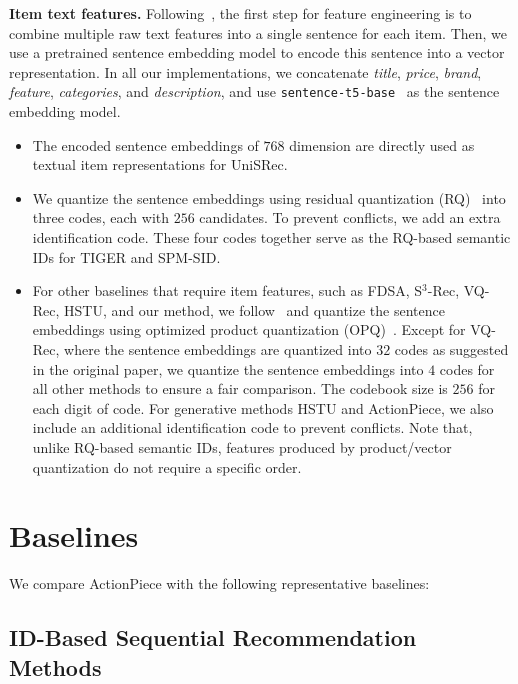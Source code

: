 \textbf{Item text features.} Following~\citet{rajput2023tiger,zheng2024lcrec,sheng2025alpharec}, the first step for feature engineering is to combine multiple raw text features into a single sentence for each item. Then, we use a pretrained sentence embedding model to encode this sentence into a vector representation. In all our implementations, we concatenate \emph{title}, \emph{price}, \emph{brand}, \emph{feature}, \emph{categories}, and \emph{description}, and use \texttt{sentence-t5-base}~\cite{ni2022sentencet5} as the sentence embedding model.
\begin{itemize}
\item The encoded sentence embeddings of $768$ dimension are directly used as textual item representations for UniSRec.
\item We quantize the sentence embeddings using residual quantization (RQ)~\cite{rajput2023tiger,zeghidour2021rqvae,zheng2024enhancing} into three codes, each with $256$ candidates. To prevent conflicts, we add an extra identification code. These four codes together serve as the RQ-based semantic IDs for TIGER and SPM-SID.
\item For other baselines that require item features, such as FDSA, S$^3$-Rec, VQ-Rec, HSTU, and our method, we follow~\citet{hou2023vqrec} and quantize the sentence embeddings using optimized product quantization (OPQ)~\cite{ge2013opq}. Except for VQ-Rec, where the sentence embeddings are quantized into $32$ codes as suggested in the original paper, we quantize the sentence embeddings into $4$ codes for all other methods to ensure a fair comparison. The codebook size is $256$ for each digit of code. For generative methods HSTU and ActionPiece, we also include an additional identification code to prevent conflicts. Note that, unlike RQ-based semantic IDs, features produced by product/vector quantization do not require a specific order.
\end{itemize}

\section{Baselines}\label{appendix:baselines}

We compare ActionPiece with the following representative baselines:

\subsection{ID-Based Sequential Recommendation Methods}

